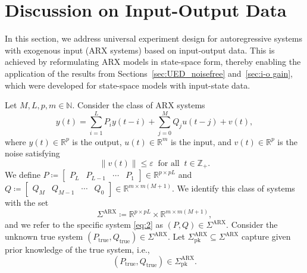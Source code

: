 \documentclass[journal,twoside,web]{ieeecolor}
\begin{document}
\section{Discussion on Input-Output Data}
\label{sec:i-o data}

In this section, we address universal experiment design for autoregressive systems with exogenous input (ARX systems) based on input-output data. This is achieved by reformulating ARX models in state-space form, thereby enabling the application of the results from Sections~\ref{sec:UED_noisefree} and~\ref{sec:i-o gain}, which were developed for state-space models with input-state data.

Let $M,L,p,m\in\mathbb{N}$. Consider the class of ARX systems
\begin{equation}
\label{eq:2}
y(t)=\sum_{i=1}^{L}P_iy(t-i)+\sum_{j=0}^{M}Q_ju(t-j)+v(t),
\end{equation}
where $y(t)\in\mathbb{R}^p$ is the output, $u(t)\in\mathbb{R}^m$ is the input, and $v(t)\in\mathbb{R}^p$ is the noise satisfying
\begin{equation}
\label{eq:ass2}
\|v(t)\|\leq\varepsilon\ \text{ for all }\ t\in\mathbb{Z}_+.
\end{equation}
We define \mbox{$P\coloneqq \begin{bmatrix}
P_L & P_{L-1} & \cdots & P_1
\end{bmatrix}\in\mathbb{R}^{p\times pL}$} and \mbox{$Q\coloneqq \begin{bmatrix}
Q_M & Q_{M-1} & \cdots & Q_0
\end{bmatrix}\in\mathbb{R}^{m\times m(M+1)}$}. We identify this class of systems with the set
\begin{equation}
\Sigma^\text{ARX}\coloneqq\mathbb{R}^{p\times pL}\times \mathbb{R}^{m\times m(M+1)},
\end{equation}
and we refer to the specific system \eqref{eq:2} as $(P,Q)\in\Sigma^\text{ARX}$. Consider the unknown true system $(P_\text{true},Q_\text{true})\in\Sigma^\text{ARX}$. Let $\Sigma^\text{ARX}_\text{pk}\subseteq\Sigma^\text{ARX}$ capture given prior knowledge of the true system, i.e.,
\begin{equation}
(P_\text{true},Q_\text{true})\in\Sigma^\text{ARX}_\text{pk}.
\end{equation}
\end{document}
